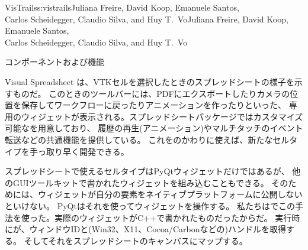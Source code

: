 \begin{aosachaptertoc}{VisTrails}{s:vistrails}{Juliana Freire, David Koop, Emanuele Santos, \\ Carlos Scheidegger, Claudio Silva, and Huy T.\ Vo}{Juliana Freire, David Koop, Emanuele Santos, \\ \hspace*{0.9cm} Carlos Scheidegger, Claudio Silva, and Huy T.\ Vo}
\begin{aosasect1}{コンポーネントおよび機能}
\begin{aosasect2}{Visual Spreadsheet}
は、VTKセルを選択したときのスプレッドシートの様子を示すものだ。
このときのツールバーには、PDFにエクスポートしたりカメラの位置を保存してワークフローに戻ったりアニメーションを作ったりといった、
専用のウィジェットが表示される。スプレッドシートパッケージではカスタマイズ可能なを用意しており、
履歴の再生(アニメーション)やマルチタッチのイベント転送などの共通機能を提供している。
これをのかわりに使えば、新たなセルタイプを手っ取り早く開発できる。

スプレッドシートで使えるセルタイプはPyQtウィジェットだけではあるが、
他のGUIツールキットで書かれたウィジェットを組み込むこともできる。
そのためには、ウィジェットが自分の要素をネイティブプラットフォームに公開しないといけない。
PyQtはそれを使ってウィジェットを操作する。
私たちはでこの手法を使った。実際のウィジェットがC++で書かれたものだったからだ。
実行時にが、ウィンドウIDと(Win32、X11、Cocoa/Carbonなどの)ハンドルを取得する。
そしてそれをスプレッドシートのキャンバスにマップする。


\end{aosasect2}
\end{aosasect1}
\end{aosachaptertoc}

